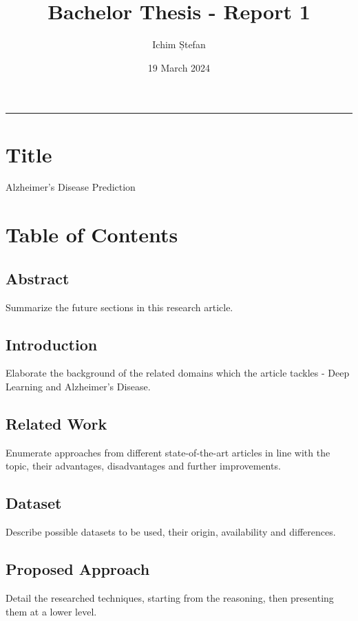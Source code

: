 \documentclass[a4paper]{article} %
\title{Bachelor Thesis - Report 1}
\author{Ichim Ștefan}
\date{19 March 2024}
\begin{document}

\maketitle %

\tableofcontents

\vspace{14pt}
\hrule

\section{Title}
Alzheimer's Disease Prediction


\section{Table of Contents}

\subsection{Abstract}
Summarize the future sections in this research article.

\subsection{Introduction}
Elaborate the background of the related domains which the article tackles - Deep Learning and Alzheimer's Disease.

\subsection{Related Work}
Enumerate approaches from different state-of-the-art articles in line with the topic, their advantages, disadvantages and
further improvements.

\subsection{Dataset}
Describe possible datasets to be used, their origin, availability and differences.

\subsection{Proposed Approach}
Detail the researched techniques, starting from the reasoning, then presenting them at a lower level.
\end{document}
